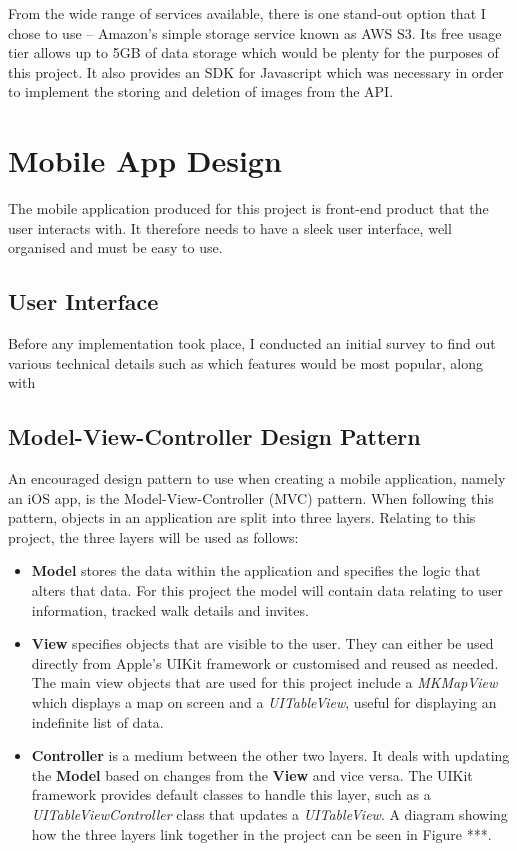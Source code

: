 From the wide range of services available, there is one stand-out option that I chose to use -- Amazon's simple storage service known as AWS S3. Its free usage tier allows up to 5GB of data storage which would be plenty for the purposes of this project. It also provides an SDK for Javascript which was necessary in order to implement the storing and deletion of images from the API.

\section{Mobile App Design}


The mobile application produced for this project is front-end product that the user interacts with. It therefore needs to have a sleek user interface, well organised and must be easy to use.

\subsection{User Interface}

Before any implementation took place, I conducted an initial survey to find out various technical details such as which features would be most popular, along with 

\subsection{Model-View-Controller Design Pattern}

An encouraged design pattern to use when creating a mobile application, namely an iOS app, is the Model-View-Controller (MVC) pattern. When following this pattern, objects in an application are split into three layers. Relating to this project, the three layers will be used as follows:

\begin{itemize}
  \item \textbf{Model} stores the data within the application and specifies the logic that alters that data. For this project the model will contain data relating to user information, tracked walk details and invites.
  
  \item \textbf{View} specifies objects that are visible to the user. They can either be used directly from Apple's UIKit framework or customised and reused as needed. The main view objects that are used for this project include a \textit{MKMapView} which displays a map on screen and a \textit{UITableView}, useful for displaying an indefinite list of data.
  
  \item \textbf{Controller} is a medium between the other two layers. It deals with updating the \textbf{Model} based on changes from the \textbf{View} and vice versa. The UIKit framework provides default classes to handle this layer, such as a \textit{UITableViewController} class that updates a \textit{UITableView}. A diagram showing how the three layers link together in the project can be seen in Figure ***.
\end{itemize}

